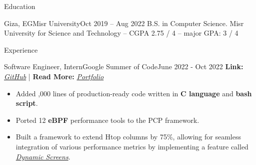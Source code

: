 \documentclass[]{Sohaib-Mohamed}
\begin{document}
\makeheader


\begin{cvsection}{Education}
   \begin{cvsubsection}{Giza, EG}{Misr University}{Oct 2019 -- Aug 2022}
      B.S. in Computer Science. Misr University for Science and Technology -- CGPA 2.75 / 4 -- major GPA: 3 / 4
   \end{cvsubsection}
\end{cvsection}


\begin{cvsection}{Experience}

   \begin{cvsubsection}{Software Engineer, Intern}{Google Summer of Code}{June 2022 - Oct 2022}
      \textbf{Link:} \href{https://gist.github.com/smalinux/e869b376b5c77cacdcda4cb14f027632}{\textit{GitHub}} | \textbf{Read More:} \href{https://gist.github.com/smalinux/2e9c5537fdac65501a655280352c9c15#google-summer-of-code-2022}{\textit{Portfolio}}
      \begin{itemize}
         \item Added ,000 lines of production-ready code written in \textbf{C language} and \textbf{bash script}.
         \item Ported 12 \textbf{eBPF} performance tools to the PCP framework.
         \item Built a framework to extend Htop columns by 75\%, allowing for seamless integration of various performance metrics by implementing a feature called \href{https://github.com/htop-dev/htop/pull/1102}{\textit{Dynamic Screens}}.
      \end{itemize}
   \end{cvsubsection}


\end{cvsection}
\end{document}
